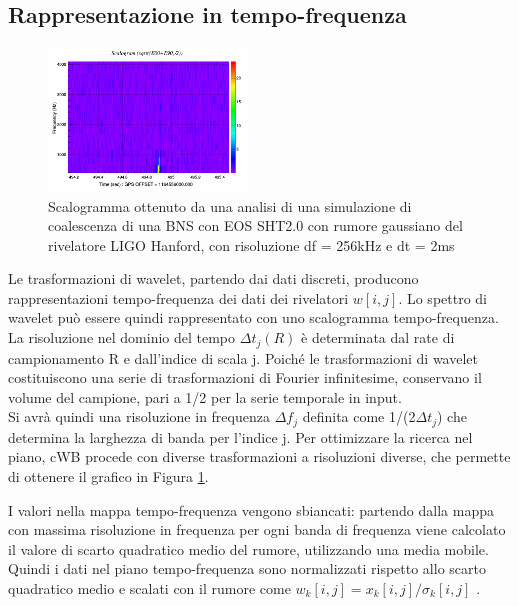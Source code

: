 \subsection{Rappresentazione in tempo-frequenza}
\begin{figure}
	\vspace{-15pt}
	\begin{center}
		\includegraphics[width=0.475\textwidth]{figures/Capitolo_2/L1_scalogram_0.png}
	\end{center}
	\vspace{-5pt}
	\caption{Scalogramma ottenuto da una analisi di una simulazione di coalescenza di una BNS con EOS SHT2.0 con rumore gaussiano del rivelatore LIGO Hanford, con risoluzione df = 256kHz e dt = 2ms}
	\label{fig:scalogram_example}
	\vspace{-15pt}
\end{figure}
\label{subsection:wavelet_transform}
Le trasformazioni di wavelet, partendo dai dati discreti, producono rappresentazioni tempo-frequenza dei dati dei rivelatori $w[i,j]$. Lo spettro di wavelet può essere quindi rappresentato con uno scalogramma tempo-frequenza. La risoluzione nel dominio del tempo $\Delta t_j(R)$ è determinata dal rate di campionamento R e dall'indice di scala j. Poiché le trasformazioni di wavelet costituiscono una serie di trasformazioni di Fourier infinitesime, conservano il volume del campione, pari a 1/2 per la serie temporale in input.\\
Si avrà quindi una risoluzione in frequenza $\Delta f_j$ definita come 1/(2$\Delta t_j$) che determina la larghezza di banda per l'indice j. Per ottimizzare la ricerca nel piano, cWB procede con diverse trasformazioni a risoluzioni diverse, che permette di ottenere il grafico in Figura \ref{fig:scalogram_example}\cite{Klimenko_2008}.

I valori nella mappa tempo-frequenza vengono sbiancati: partendo dalla mappa con massima risoluzione in frequenza per ogni banda di frequenza viene calcolato il valore di scarto quadratico medio del rumore, utilizzando una media mobile. Quindi i dati nel piano tempo-frequenza sono normalizzati rispetto allo scarto quadratico medio e scalati con il rumore come $w_k[i,j] = x_k[i,j]/\sigma_k[i,j]$ \cite{Klimenko_2016}.

